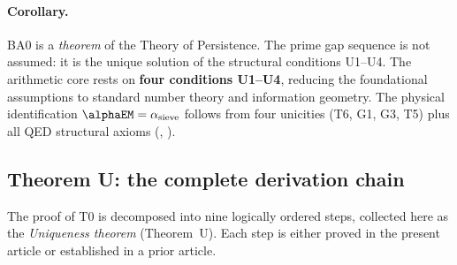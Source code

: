 \documentclass[12pt,a4paper]{article}
\begin{document}
\paragraph{Corollary.}
BA0 is a \emph{theorem} of the Theory of Persistence. The prime gap
sequence is not assumed: it is the unique solution of the structural
conditions U1--U4. The arithmetic core rests on \textbf{four conditions
U1--U4}, reducing the foundational assumptions to standard number
theory and information geometry.  The physical
identification $\alphaEM = \alpha_{\rm sieve}$ follows from
four unicities (T6, G1, G3, T5) plus all QED structural
axioms (\cite{companion_M5}, \cite{companion_physics}).

\subsection{Theorem U: the complete derivation chain}
\label{sec:ch25_theorem_U}

The proof of T0 is decomposed into nine logically ordered steps,
collected here as the \emph{Uniqueness theorem} (Theorem~U).  Each
step is either proved in the present article or established in
a prior article.
\end{document}
